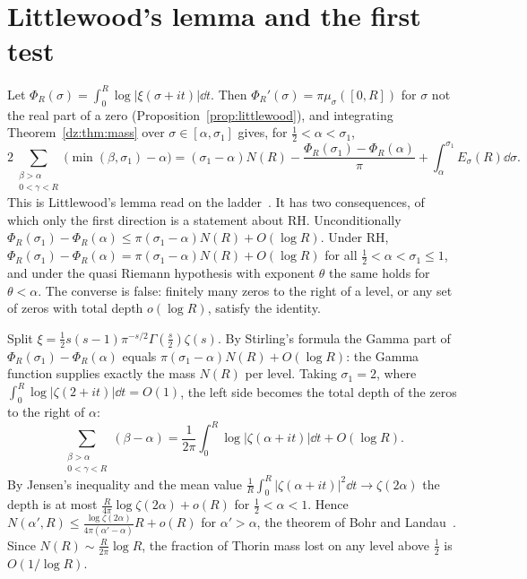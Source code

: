 \section{Littlewood's lemma and the first test}\label{dz:sec:littlewood}
Let $\Phi_R(\sigma)=\int_0^R\log|\xi(\sigma+it)|\dd t$. Then $\Phi_R'(\sigma)=\pi\mu_\sigma([0,R])$ for $\sigma$ not the real part of a zero (Proposition~\ref{prop:littlewood}), and integrating Theorem~\ref{dz:thm:mass} over $\sigma\in[\alpha,\sigma_1]$ gives, for $\frac12<\alpha<\sigma_1$,
\[
2\sum_{\substack{\beta>\alpha\\0<\gamma<R}}\big(\min(\beta,\sigma_1)-\alpha\big)=(\sigma_1-\alpha)N(R)-\frac{\Phi_R(\sigma_1)-\Phi_R(\alpha)}\pi+\int_\alpha^{\sigma_1}E_\sigma(R)\dd\sigma .
\]
This is Littlewood's lemma read on the ladder~\cite[Section 9.9]{Titchmarsh}. It has two consequences, of which only the first direction is a statement about RH. Unconditionally $\Phi_R(\sigma_1)-\Phi_R(\alpha)\le\pi(\sigma_1-\alpha)N(R)+O(\log R)$. Under RH, $\Phi_R(\sigma_1)-\Phi_R(\alpha)=\pi(\sigma_1-\alpha)N(R)+O(\log R)$ for all $\frac12<\alpha<\sigma_1\le1$, and under the quasi Riemann hypothesis with exponent $\theta$ the same holds for $\theta<\alpha$. The converse is false: finitely many zeros to the right of a level, or any set of zeros with total depth $o(\log R)$, satisfy the identity.

Split $\xi=\frac12s(s-1)\pi^{-s/2}\Gamma(\frac s2)\zeta(s)$. By Stirling's formula the Gamma part of $\Phi_R(\sigma_1)-\Phi_R(\alpha)$ equals $\pi(\sigma_1-\alpha)N(R)+O(\log R)$: the Gamma function supplies exactly the mass $N(R)$ per level. Taking $\sigma_1=2$, where $\int_0^R\log|\zeta(2+it)|\dd t=O(1)$, the left side becomes the total depth of the zeros to the right of $\alpha$:
\begin{equation}\label{dz:eq:depth}
\sum_{\substack{\beta>\alpha\\0<\gamma<R}}(\beta-\alpha)=\frac1{2\pi}\int_0^R\log|\zeta(\alpha+it)|\dd t+O(\log R).
\end{equation}
By Jensen's inequality and the mean value $\frac1R\int_0^R|\zeta(\alpha+it)|^2\dd t\to\zeta(2\alpha)$ the depth is at most $\frac R{4\pi}\log\zeta(2\alpha)+o(R)$ for $\frac12<\alpha<1$. Hence $N(\alpha',R)\le\frac{\log\zeta(2\alpha)}{4\pi(\alpha'-\alpha)}R+o(R)$ for $\alpha'>\alpha$, the theorem of Bohr and Landau~\cite{BL14}. Since $N(R)\sim\frac R{2\pi}\log R$, the fraction of Thorin mass lost on any level above $\frac12$ is $O(1/\log R)$.

